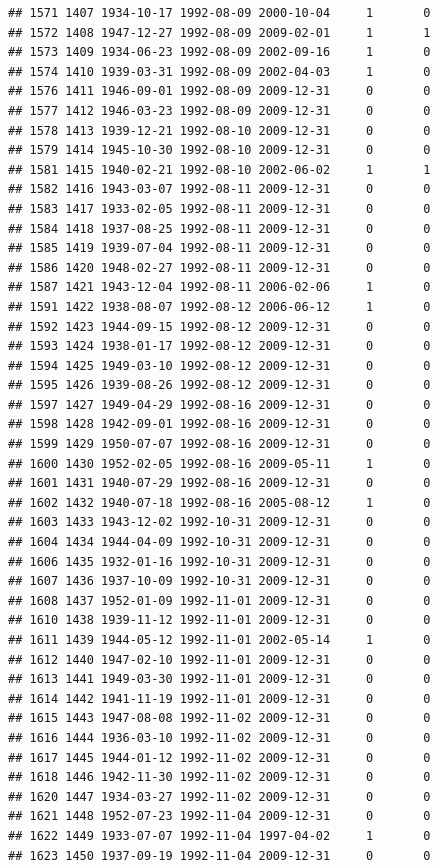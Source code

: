\documentclass[
]{book}
\begin{document}
\begin{verbatim}
## 1571 1407 1934-10-17 1992-08-09 2000-10-04     1       0
## 1572 1408 1947-12-27 1992-08-09 2009-02-01     1       1
## 1573 1409 1934-06-23 1992-08-09 2002-09-16     1       0
## 1574 1410 1939-03-31 1992-08-09 2002-04-03     1       0
## 1576 1411 1946-09-01 1992-08-09 2009-12-31     0       0
## 1577 1412 1946-03-23 1992-08-09 2009-12-31     0       0
## 1578 1413 1939-12-21 1992-08-10 2009-12-31     0       0
## 1579 1414 1945-10-30 1992-08-10 2009-12-31     0       0
## 1581 1415 1940-02-21 1992-08-10 2002-06-02     1       1
## 1582 1416 1943-03-07 1992-08-11 2009-12-31     0       0
## 1583 1417 1933-02-05 1992-08-11 2009-12-31     0       0
## 1584 1418 1937-08-25 1992-08-11 2009-12-31     0       0
## 1585 1419 1939-07-04 1992-08-11 2009-12-31     0       0
## 1586 1420 1948-02-27 1992-08-11 2009-12-31     0       0
## 1587 1421 1943-12-04 1992-08-11 2006-02-06     1       0
## 1591 1422 1938-08-07 1992-08-12 2006-06-12     1       0
## 1592 1423 1944-09-15 1992-08-12 2009-12-31     0       0
## 1593 1424 1938-01-17 1992-08-12 2009-12-31     0       0
## 1594 1425 1949-03-10 1992-08-12 2009-12-31     0       0
## 1595 1426 1939-08-26 1992-08-12 2009-12-31     0       0
## 1597 1427 1949-04-29 1992-08-16 2009-12-31     0       0
## 1598 1428 1942-09-01 1992-08-16 2009-12-31     0       0
## 1599 1429 1950-07-07 1992-08-16 2009-12-31     0       0
## 1600 1430 1952-02-05 1992-08-16 2009-05-11     1       0
## 1601 1431 1940-07-29 1992-08-16 2009-12-31     0       0
## 1602 1432 1940-07-18 1992-08-16 2005-08-12     1       0
## 1603 1433 1943-12-02 1992-10-31 2009-12-31     0       0
## 1604 1434 1944-04-09 1992-10-31 2009-12-31     0       0
## 1606 1435 1932-01-16 1992-10-31 2009-12-31     0       0
## 1607 1436 1937-10-09 1992-10-31 2009-12-31     0       0
## 1608 1437 1952-01-09 1992-11-01 2009-12-31     0       0
## 1610 1438 1939-11-12 1992-11-01 2009-12-31     0       0
## 1611 1439 1944-05-12 1992-11-01 2002-05-14     1       0
## 1612 1440 1947-02-10 1992-11-01 2009-12-31     0       0
## 1613 1441 1949-03-30 1992-11-01 2009-12-31     0       0
## 1614 1442 1941-11-19 1992-11-01 2009-12-31     0       0
## 1615 1443 1947-08-08 1992-11-02 2009-12-31     0       0
## 1616 1444 1936-03-10 1992-11-02 2009-12-31     0       0
## 1617 1445 1944-01-12 1992-11-02 2009-12-31     0       0
## 1618 1446 1942-11-30 1992-11-02 2009-12-31     0       0
## 1620 1447 1934-03-27 1992-11-02 2009-12-31     0       0
## 1621 1448 1952-07-23 1992-11-04 2009-12-31     0       0
## 1622 1449 1933-07-07 1992-11-04 1997-04-02     1       0
## 1623 1450 1937-09-19 1992-11-04 2009-12-31     0       0

\end{verbatim}
\end{document}
